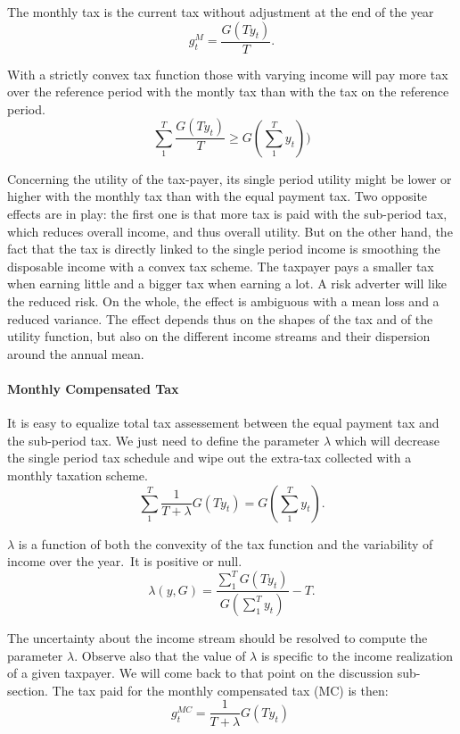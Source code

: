 The monthly tax is the current tax without adjustment at the end of the year
\[
g_{t}^{M}=\frac{G(Ty_{t})}{T}.
\]


With a strictly convex tax function those with varying income will pay more
tax over the reference period with the montly tax than with the tax on the
reference period.%
\[
\sum_{1}^{T}\frac{G(Ty_{t})}{T}\geq G(\sum_{1}^{T}y_{t}))
\]


Concerning the utility of the tax-payer, its single period utility might be
lower or higher with the monthly tax than with the equal payment tax. Two
opposite effects are in play: the first one is that more tax is paid with the
sub-period tax, which reduces overall income, and thus overall utility. But on
the other hand, the fact that the tax is directly linked to the single period
income is smoothing the disposable income with a convex tax scheme. The
taxpayer pays a smaller tax when earning little and a bigger tax when earning
a lot. A risk adverter will like the reduced risk. On the whole, the effect is
ambiguous with a mean loss and a reduced variance. The effect depends thus on
the shapes of the tax and of the utility function, but also on the different
income streams and their dispersion around the annual mean.

\paragraph{Monthly Compensated Tax}

It is easy to equalize total tax assessement between the equal payment tax and
the sub-period tax. We just need to define the parameter $\lambda$ which will
decrease the single period tax schedule and wipe out the extra-tax collected
with a monthly taxation scheme.
\begin{equation}
\sum_{1}^{T}\frac{1}{T+\lambda}G(Ty_{t})=G\left(  \sum_{1}^{T}y_{t}\right)
.\label{compensation_eq}%
\end{equation}


$\lambda$ is a function of both the convexity of the tax function and the
variability of income over the year.\ It is positive or null.\
\[
\lambda(y,G)=\frac{\sum_{1}^{T}G(Ty_{t})}{G\left(  \sum_{1}^{T}y_{t}\right)
}-T.
\]


The uncertainty about the income stream should be resolved to compute the
parameter $\lambda$. Observe also that the value of $\lambda$ is specific to
the income realization of a given taxpayer. We will come back to that point on
the discussion sub-section. The tax paid for the monthly compensated tax (MC)
is then:
\[
g_{t}^{MC}=\frac{1}{T+\lambda}G(Ty_{t})\
\]


